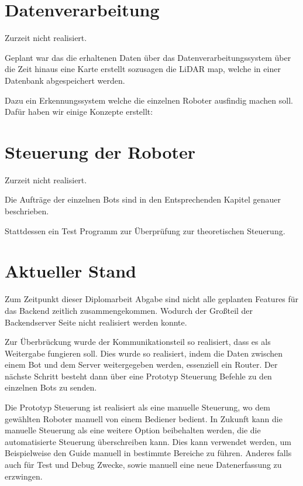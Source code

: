 \section{Datenverarbeitung}
Zurzeit nicht realisiert.

Geplant war das die erhaltenen Daten über das Datenverarbeitungssystem 
über die Zeit hinaus eine Karte erstellt sozusagen die LiDAR map,
welche in einer Datenbank abgespeichert werden.

Dazu ein Erkennungssystem welche die einzelnen Roboter ausfindig machen soll.
Dafür haben wir einige Konzepte erstellt:

\section{Steuerung der Roboter}
\label{subsec:backend_robot_detection}
Zurzeit nicht realisiert.

Die Aufträge der einzelnen Bots sind in den Entsprechenden Kapitel genauer beschrieben.

Stattdessen ein Test Programm zur Überprüfung zur theoretischen Steuerung.

\section{Aktueller Stand}
\label{subsec:backend_aktueller_stand}
Zum Zeitpunkt dieser Diplomarbeit Abgabe 
sind nicht alle geplanten Features für das Backend zeitlich zusammengekommen.
Wodurch der Großteil der Backendserver Seite nicht realisiert werden konnte.

Zur Überbrückung wurde der Kommunikationsteil so realisiert, 
dass es als Weitergabe fungieren soll.
Dies wurde so realisiert, indem die Daten 
zwischen einem Bot und dem Server weitergegeben werden, essenziell ein Router. 
Der nächste Schritt besteht dann über eine Prototyp Steuerung 
Befehle zu den einzelnen Bots zu senden.

Die Prototyp Steuerung ist realisiert als eine manuelle Steuerung, 
wo dem gewählten Roboter manuell von einem Bediener bedient.
In Zukunft kann die manuelle Steuerung als eine weitere Option beibehalten werden, 
die die automatisierte Steuerung überschreiben kann. 
Dies kann verwendet werden, 
um Beispielweise den Guide manuell in bestimmte Bereiche zu führen.
Anderes falls auch für Test und Debug Zwecke, 
sowie manuell eine neue Datenerfassung zu erzwingen.

